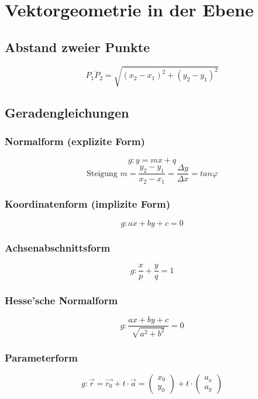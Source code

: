\section{Vektorgeometrie in der Ebene}

\subsection{Abstand zweier Punkte}
\[ \boxed{ \overline{P_1 P_2} = \sqrt{ (x_2 - x_1)^2 + (y_2 - y_1)^2 } } \]

\subsection{Geradengleichungen}

\subsubsection{Normalform (explizite Form)}
\[ \boxed{ g: y= mx + q }\]
\[ \boxed{ \text{Steigung } m = \frac{y_2 - y_1}{x_2 - x_1} = \frac{\Delta y}{\Delta x}  = tan \varphi } \]

\subsubsection{Koordinatenform (implizite Form)}
\[ \boxed{ g: ax + by + c = 0 } \]

\subsubsection{Achsenabschnittsform}
\[ \boxed{ g: \frac{x}{p} + \frac{y}{q} = 1 } \]

\subsubsection{Hesse'sche Normalform}
\[ \boxed{ g:  \frac{ax + by + c}{\sqrt{ a^2 + b^2 } } = 0 }  \]

\subsubsection{Parameterform}
\[ \boxed{ 
	g: \vec{r} = \vec{r_0} + t \cdot \vec{a}  = 
    \left( 
		\begin{array}{cc} 
	  		x_0 \\ y_0
		\end{array}
	\right)
    + t \cdot 
    \left( 
		\begin{array}{cc} 
			a_x \\ a_y
		\end{array}
    \right)  
   }
\]


